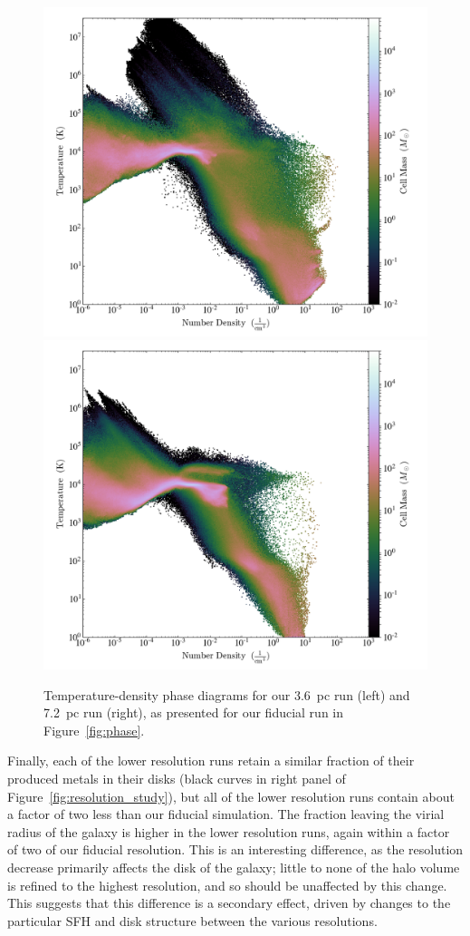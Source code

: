 \documentclass[twocolumn]{aastex61}
\begin{document}
\begin{figure}
\centering
\includegraphics[width=0.475\linewidth]{3pc_phase.png}
\includegraphics[width=0.475\linewidth]{6pc_phase.png}
\caption{Temperature-density phase diagrams for our 3.6~pc run (left) and 7.2~pc run (right), as presented for our fiducial run in Figure~\ref{fig:phase}.}
\label{fig:phase_resolution}
\end{figure}

Finally, each of the lower resolution runs retain a similar fraction of their produced metals in their disks (black curves in right panel of Figure~\ref{fig:resolution_study}), but all of the lower resolution runs contain about a factor of two less than our fiducial simulation. The fraction leaving the virial radius of the galaxy is higher in the lower resolution runs, again within a factor of two of our fiducial resolution. This is an interesting difference, as the resolution decrease primarily affects the disk of the galaxy; little to none of the halo volume is refined to the highest resolution, and so should be unaffected by this change. This suggests that this difference is a secondary effect, driven by changes to the particular SFH and disk structure between the various resolutions.

\end{document}
